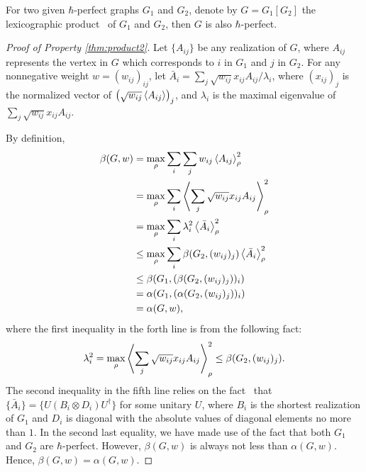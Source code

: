 \begin{prop} \label{thm:product2}
  For two given $\hbar$-perfect graphs $G_1$ and $G_2$, denote by $G = G_1[G_2]$ the lexicographic product~\cite{sabidussi1961} of $G_1$ and $G_2$, then $G$ is also $\hbar$-perfect.
\end{prop}
\begin{proof}[Proof of Property \ref{thm:product2}]
  Let $\{A_{ij}\}$ be any realization of $G$, where $A_{ij}$ represents the vertex in $G$ which corresponds to $i$ in $G_1$ and $j$ in $G_2$. 
  For any nonnegative weight $w = (w_{ij})_{ij}$, let $\bar{A}_i = \sum_j \sqrt{w_{ij}}x_{ij}A_{ij}/\lambda_i$, where $(x_{ij})_{j}$ is the normalized vector of $\left(\sqrt{w_{ij}} \left\langle A_{ij} \right\rangle\right)_{j}$, and $\lambda_i$ is the maximal eigenvalue of $\sum_j \sqrt{w_{ij}}x_{ij}A_{ij}$.

  By definition,
  \begin{align}\label{eq:product_upper_bound}
    \beta(G,w) &= \max_{\rho} \sum_{i} \sum_j w_{ij}\left\langle A_{ij} \right\rangle_{\rho}^2\nonumber\\
             &= \max_{\rho}\sum_i \left\langle \sum_j \sqrt{w_{ij}}  x_{ij} A_{ij} \right\rangle_{\rho}^2\nonumber\\
             &= \max_{\rho}\sum_i \lambda_i^2 \left\langle \bar{A}_i \right\rangle_{\rho}^2\nonumber\\
             &\le \max_{\rho}\sum_i \beta(G_2, (w_{ij})_j) \left\langle \bar{A}_i \right\rangle_{\rho}^2\nonumber\\
             &\le \beta(G_1, (\beta(G_2, (w_{ij})_j))_i )\nonumber\\
             &= \alpha(G_1, (\alpha(G_2, (w_{ij})_j))_i )\nonumber\\
             &= \alpha(G,w),
  \end{align}
  where the first inequality in the forth line is from the following fact: 
  \begin{equation}
    \lambda_i^2 = \max_{\rho}\left\langle \sum_j \sqrt{w_{ij}} x_{ij} A_{ij} \right\rangle_{\rho}^2 \le \beta(G_2, (w_{ij})_j).
  \end{equation}
  The second inequality in the fifth line relies on the fact~\cite{xu2023bounding} that $\{\bar{A}_i\} = \{ U (B_i\otimes D_i) U^\dagger\}$ for some unitary $U$, where $B_i$ is the shortest realization of $G_1$ and $D_i$ is diagonal with the absolute values of diagonal elements no more than $1$.
  In the second last equality, we have made use of the fact that both $G_1$ and $G_2$ are $\hbar$-perfect.
  However, $\beta(G,w)$ is always not less than $\alpha(G,w)$. Hence, $\beta(G,w) = \alpha(G,w)$.
\end{proof}

